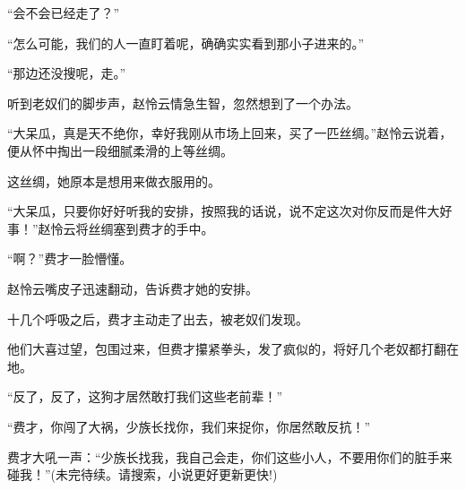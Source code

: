 \begin{this_body}
“会不会已经走了？”

“怎么可能，我们的人一直盯着呢，确确实实看到那小子进来的。”

“那边还没搜呢，走。”

听到老奴们的脚步声，赵怜云情急生智，忽然想到了一个办法。

“大呆瓜，真是天不绝你，幸好我刚从市场上回来，买了一匹丝绸。”赵怜云说着，便从怀中掏出一段细腻柔滑的上等丝绸。

这丝绸，她原本是想用来做衣服用的。

“大呆瓜，只要你好好听我的安排，按照我的话说，说不定这次对你反而是件大好事！”赵怜云将丝绸塞到费才的手中。

“啊？”费才一脸懵懂。

赵怜云嘴皮子迅速翻动，告诉费才她的安排。

十几个呼吸之后，费才主动走了出去，被老奴们发现。

他们大喜过望，包围过来，但费才攥紧拳头，发了疯似的，将好几个老奴都打翻在地。

“反了，反了，这狗才居然敢打我们这些老前辈！”

“费才，你闯了大祸，少族长找你，我们来捉你，你居然敢反抗！”

费才大吼一声：“少族长找我，我自己会走，你们这些小人，不要用你们的脏手来碰我！”(未完待续。请搜索，小说更好更新更快!)

\end{this_body}

